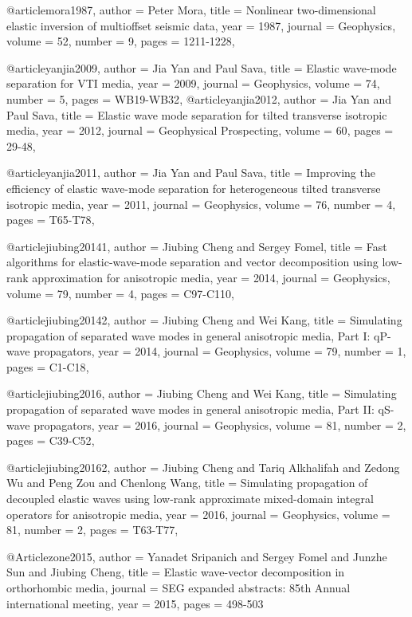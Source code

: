 {@article{mora1987,
author = {Peter Mora},
title = {Nonlinear two-dimensional elastic inversion of multioffset seismic data},
year = {1987},
journal = {Geophysics},
volume = {52},
number = {9},
pages = {1211-1228},
}

@article{yanjia2009,
author = {Jia Yan and Paul Sava},
title = {Elastic wave-mode separation for VTI media},
year = {2009},
journal = {Geophysics},
volume = {74},
number = {5},
pages = {WB19-WB32},
}
@article{yanjia2012,
author = {Jia Yan and Paul Sava},
title = {Elastic wave mode separation for tilted transverse isotropic media},
year = {2012},
journal = {Geophysical Prospecting},
volume = {60},
pages = {29-48},
}

@article{yanjia2011,
author = {Jia Yan and Paul Sava},
title = {Improving the efficiency of elastic wave-mode separation for heterogeneous tilted transverse isotropic media},
year = {2011},
journal = {Geophysics},
volume = {76},
number = {4},
pages = {T65-T78},
}

@article{jiubing20141,
author = {Jiubing Cheng and Sergey Fomel},
title = {Fast algorithms for elastic-wave-mode separation and vector decomposition using low-rank approximation for anisotropic media},
year = {2014},
journal = {Geophysics},
volume = {79},
number = {4},
pages = {C97-C110},
}

@article{jiubing20142,
author = {Jiubing Cheng and Wei Kang},
title = {Simulating propagation of separated wave modes in general anisotropic media, Part I: qP-wave propagators},
year = {2014},
journal = {Geophysics},
volume = {79},
number = {1},
pages = {C1-C18},
}

@article{jiubing2016,
author = {Jiubing Cheng and Wei Kang},
title = {Simulating propagation of separated wave modes in general anisotropic media, Part II: qS-wave propagators},
year = {2016},
journal = {Geophysics},
volume = {81},
number = {2},
pages = {C39-C52},
}

@article{jiubing20162,
author = {Jiubing Cheng and Tariq Alkhalifah and Zedong Wu and Peng Zou and Chenlong Wang},
title = {Simulating propagation of decoupled elastic waves using low-rank approximate mixed-domain integral operators for anisotropic media},
year = {2016},
journal = {Geophysics},
volume = {81},
number = {2},
pages = {T63-T77},
}

@Article{zone2015,
  author = 	 {Yanadet Sripanich and Sergey Fomel and Junzhe Sun and Jiubing Cheng},
  title = 	 {Elastic wave-vector decomposition in orthorhombic media},
  journal = 	 {SEG expanded abstracts: 85th Annual international meeting},
  year = 	 2015,
  pages =	 {498-503}
}


}
